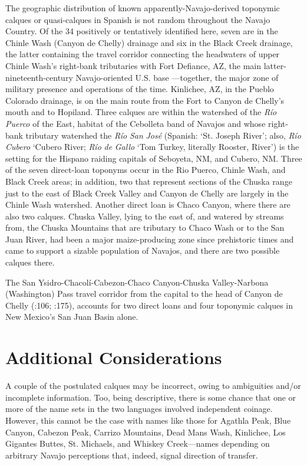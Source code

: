 The geographic distribution of known apparently-Navajo-derived toponymic calques or quasi-calques in Spanish is not random throughout the Navajo Country.  Of the 34 positively or tentatively identified here, seven are in the Chinle Wash (Canyon de Chelly) drainage and six in the Black Creek drainage, the latter containing the travel corridor connecting the headwaters of upper Chinle Wash’s right-bank tributaries with Fort Defiance, AZ, the main latter-nineteenth-century Navajo-oriented U.S. base \citep{Frink1968}—together, the major zone of military presence and operations of the time.  Kinlichee, AZ, in the Pueblo Colorado drainage, is on the main route from the Fort to Canyon de Chelly’s mouth and to Hopiland.  Three calques are within the watershed of the \textit{Río} \textit{Puerco} of the East, habitat of the Cebolleta band of Navajos and whose right-bank tributary watershed the \textit{Río} \textit{San} \textit{José} (Spanish: ‘St. Joseph River’; also, \textit{Río} \textit{Cubero} ‘Cubero River; \textit{Río} \textit{de} \textit{Gallo} ‘Tom Turkey, literally Rooster, River’) is the setting for the Hispano raiding capitals of Seboyeta, NM, and Cubero, NM.  Three of the seven direct-loan toponyms occur in the Rio Puerco, Chinle Wash, and Black Creek areas; in addition, two that represent sections of the Chuska range just to the east of Black Creek Valley and Canyon de Chelly are largely in the Chinle Wash watershed.  Another direct loan is Chaco Canyon, where there are also two calques.  Chuska Valley, lying to the east of, and watered by streams from, the Chuska Mountains that are tributary to Chaco Wash or to the San Juan River, had been a major maize-producing zone since prehistoric times and came to support a sizable population of Navajos, and there are two possible calques there.

  The San Ysidro-Chacolí-Cabezon-Chaco Canyon-Chuska Valley-Narbona (Washington) Pass travel corridor from the capital to the head of Canyon de Chelly (\citealt{Reeve1971a}:106; \citealt{Dutton1886}:175), accounts for two direct loans and four toponymic calques in New Mexico’s San Juan Basin alone.

\section{\textbf{Additional} \textbf{Considerations}}

A couple of the postulated calques may be incorrect, owing to ambiguities and/or incomplete information.  Too, being descriptive, there is some chance that one or more of the name sets in the two languages involved independent coinage.  However, this cannot be the case with names like those for Agathla Peak, Blue Canyon, Cabezon Peak, Carrizo Mountains, Dead Mans Wash, Kinlichee, Los Gigantes Buttes, St. Michaels, and Whiskey Creek—names depending on arbitrary Navajo perceptions that, indeed, signal direction of transfer. 

